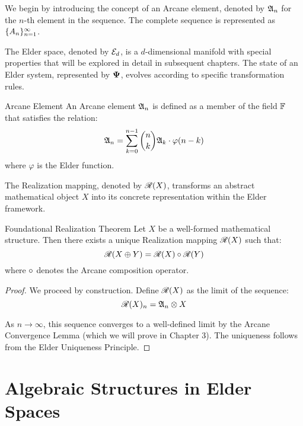 \begin{twocolumnlayout}
We begin by introducing the concept of an Arcane element, denoted by $\mathfrak{A}_{n}$ for the $n$-th element in the sequence. The complete sequence is represented as $\{A_{n}\}_{n=1}^{\infty}$.

The Elder space, denoted by $\mathcal{E}_{d}$, is a $d$-dimensional manifold with special properties that will be explored in detail in subsequent chapters. The state of an Elder system, represented by $\mathbf{\Psi}$, evolves according to specific transformation rules.

\begin{definition}{Arcane Element}{}
An Arcane element $\mathfrak{A}_{n}$ is defined as a member of the field $\mathbb{F}$ that satisfies the relation:
\begin{equation}
\mathfrak{A}_{n} = \sum_{k=0}^{n-1} \binom{n}{k} \mathfrak{A}_{k} \cdot \varphi(n-k)
\end{equation}
where $\varphi$ is the Elder function.
\end{definition}

The Realization mapping, denoted by $\mathscr{R}(X)$, transforms an abstract mathematical object $X$ into its concrete representation within the Elder framework.

\begin{theorem}{Foundational Realization Theorem}{}
Let $X$ be a well-formed mathematical structure. Then there exists a unique Realization mapping $\mathscr{R}(X)$ such that:
\begin{equation}
\mathscr{R}(X \oplus Y) = \mathscr{R}(X) \circ \mathscr{R}(Y)
\end{equation}
where $\circ$ denotes the Arcane composition operator.
\end{theorem}

\begin{proof}
We proceed by construction. Define $\mathscr{R}(X)$ as the limit of the sequence:
\begin{equation}
\mathscr{R}(X)_n = \mathfrak{A}_{n} \otimes X
\end{equation}

As $n \rightarrow \infty$, this sequence converges to a well-defined limit by the Arcane Convergence Lemma (which we will prove in Chapter 3). The uniqueness follows from the Elder Uniqueness Principle.
\end{proof}
\end{twocolumnlayout}

\section{Algebraic Structures in Elder Spaces}

